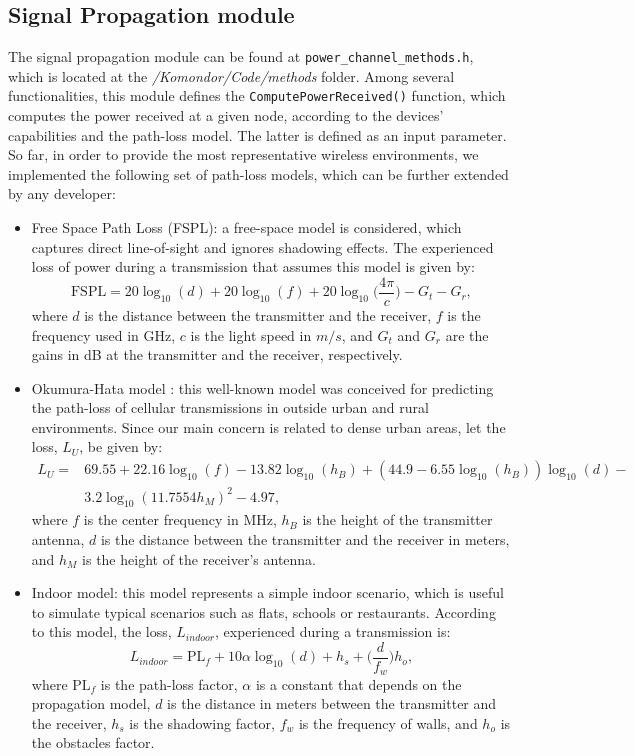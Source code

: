 \documentclass[a4paper]{article}
\begin{document}
\subsection{Signal Propagation module}
\label{section:propagation}
The signal propagation module can be found at \texttt{power\_channel\_methods.h}, which is located at the \textit{/Komondor/Code/methods} folder. Among several functionalities, this module defines the \texttt{ComputePowerReceived()} function, which computes the power received at a given node, according to the devices' capabilities and the path-loss model. The latter is defined as an input parameter. So far, in order to provide the most representative wireless environments, we implemented the following set of path-loss models, which can be further extended by any developer:
\begin{itemize}
	\item Free Space Path Loss (FSPL): a free-space model is considered, which captures direct line-of-sight and ignores shadowing effects. The experienced loss of power during a transmission that assumes this model is given by:
	\begin{equation}
	\text{FSPL} = 20 \log_{10}(d) + 20 \log_{10}(f) + 20 \log_{10}\Big(\frac{4\pi}{c}\Big) - G_t - G_r,
	\nonumber
	\end{equation}
	where $d$ is the distance between the transmitter and the receiver, $f$ is the frequency used in GHz, $c$ is the light speed in $m/s$, and $G_t$ and $G_r$ are the gains in dB at the transmitter and the receiver, respectively.
	\item Okumura-Hata model \cite{hata1980empirical}: this well-known model was conceived for predicting the path-loss of cellular transmissions in outside urban and rural environments. Since our main concern is related to dense urban areas, let the loss, $L_U$, be given by: 
	\begin{equation}
	\begin{aligned}
	L_U =  &69.55 + 22.16 \log_{10}(f) - 13.82 \log_{10} (h_B) + (44.9 - 6.55 \log_{10}(h_B)) \log_{10}(d) - \\ 
	& 3.2 \log_{10}(11.7554 h_M)^2 - 4.97,
	\end{aligned}
	\nonumber
	\end{equation}
	where $f$ is the center frequency in MHz, $h_B$ is the height of the transmitter antenna, $d$ is the distance between the transmitter and the receiver in meters, and $h_M$ is the height of the receiver's antenna.
	\item Indoor model: this model represents a simple indoor scenario, which is useful to simulate typical scenarios such as flats, schools or restaurants. According to this model, the loss, $L_{indoor}$, experienced during a transmission is:		
	\begin{equation}
	L_{indoor} = \text{PL}_f + 10 \alpha \log_{10}(d) + h_s + \Big(\frac{d}{f_w}\Big) h_o,
	\nonumber
	\end{equation}
	where $\text{PL}_f$ is the path-loss factor, $\alpha$ is a constant that depends on the propagation model, $d$ is the distance in meters between the transmitter and the receiver, $h_s$ is the shadowing factor, $f_w$ is the frequency of walls, and $h_o$ is the obstacles factor.
	

\end{itemize}
\end{document}
